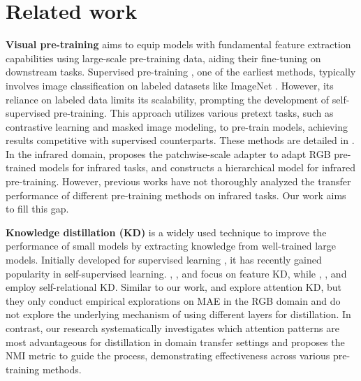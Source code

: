 \section{Related work}
\label{app:related_work}

\textbf{Visual pre-training} aims to equip models with fundamental feature extraction capabilities using large-scale pre-training data, aiding their fine-tuning on downstream tasks. Supervised pre-training \citep{resnet, vit}, one of the earliest methods, typically involves image classification on labeled datasets like ImageNet \citep{imagenet}. However, its reliance on labeled data limits its scalability, prompting the development of self-supervised pre-training. This approach utilizes various pretext tasks, such as contrastive learning and masked image modeling, to pre-train models, achieving results competitive with supervised counterparts. These methods are detailed in . In the infrared domain, \citet{pad} proposes the patchwise-scale adapter to adapt RGB pre-trained models for infrared tasks, and \citet{infmae} constructs a hierarchical model for infrared pre-training. However, previous works have not thoroughly analyzed the transfer performance of different pre-training methods on infrared tasks. Our work aims to fill this gap.

\textbf{Knowledge distillation (KD)} is a widely used technique to improve the performance of small models by extracting knowledge from well-trained large models. Initially developed for supervised learning \citep{distill}, it has recently gained popularity in self-supervised learning. \citet{DMAE}, \citet{dbot}, and \citet{efficient_sam} focus on feature KD, while \citet{dino}, \citet{iBOT}, and \citet{dinov2} employ self-relational KD. Similar to our work, \citet{close_look} and \citet{tinymim} explore attention KD, but they only conduct empirical explorations on MAE in the RGB domain and do not explore the underlying mechanism of using different layers for distillation. In contrast, our research systematically investigates which attention patterns are most advantageous for distillation in domain transfer settings and proposes the NMI metric to guide the process, demonstrating effectiveness across various pre-training methods.


